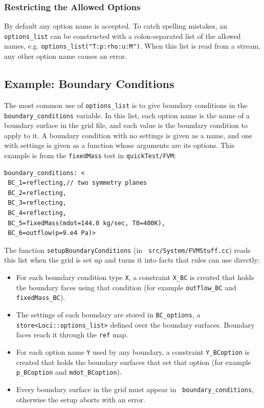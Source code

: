 \subsubsection {Restricting the Allowed Options}
%
By default any option name is accepted.  To catch spelling mistakes, an
{\tt options\_list} can be constructed with a colon-separated list of
the allowed names, e.g. {\tt options\_list("T:p:rho:u:M")}.  When this
list is read from a stream, any other option name causes an error.
%
\subsection {Example: Boundary Conditions}
%
The most common use of {\tt options\_list} is to give boundary
conditions in the {\tt boundary\_conditions} variable.  In this list,
each option name is the name of a boundary surface in the grid file,
and each value is the boundary condition to apply to it.  A boundary
condition with no settings is given as a name, and one with settings is
given as a function whose arguments are its options.  This example is
from the {\tt fixedMass} test in {\tt quickTest/FVM}:
\begin{verbatim}
boundary_conditions: <
 BC_1=reflecting,// two symmetry planes
 BC_2=reflecting,
 BC_3=reflecting,
 BC_4=reflecting,
 BC_5=fixedMass(mdot=144.0 kg/sec, T0=400K),
 BC_6=outflow(p=9.e4 Pa)>
\end{verbatim}
%
The function {\tt setupBoundaryConditions} (in {\tt
  src/System/FVMStuff.cc}) reads this list when the grid is set up and
turns it into facts that rules can use directly:
\begin{itemize}
\item For each boundary condition type {\tt X}, a constraint {\tt X\_BC}
  is created that holds the boundary faces using that condition (for
  example {\tt outflow\_BC} and {\tt fixedMass\_BC}).
\item The settings of each boundary are stored in {\tt BC\_options}, a
  {\tt store<Loci::options\_list>} defined over the boundary surfaces.
  Boundary faces reach it through the {\tt ref} map.
\item For each option name {\tt Y} used by any boundary, a constraint
  {\tt Y\_BCoption} is created that holds the boundary surfaces that set
  that option (for example {\tt p\_BCoption} and {\tt mdot\_BCoption}).
\item Every boundary surface in the grid must appear in {\tt
  boundary\_conditions}, otherwise the setup aborts with an error.
\end{itemize}
